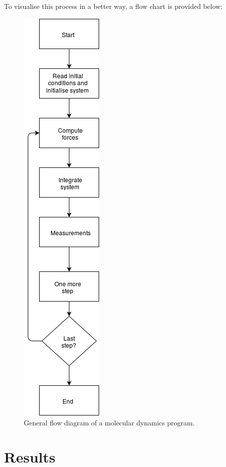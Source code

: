 \documentclass[11pt,a4paper,oneside]{article}
\begin{document}
		To visualise this process in a better way, a flow chart is provided below:\\
		
		\begin{figure}[ht!]\begin{center}\includegraphics[scale=0.5]{MD.png}\par\protect\caption{\scriptsize General flow diagram of a molecular dynamics program.}\end{center}\end{figure}
		
	\section{Results}
\end{document}
